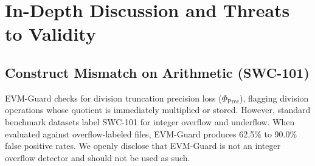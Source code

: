 \documentclass[conference]{IEEEtran}
\begin{document}
\begin{table}[h]
\centering
\small
\renewcommand{\arraystretch}{1.12}
\caption{Final pre-registered synthetic test (210 Solidity 0.5.12 contracts, template injection). Exact 95\% Clopper--Pearson intervals. Denial of service has no positives for the baselines to detect in this corpus.}
\label{tab:final_synth}
\end{table}

\section{In-Depth Discussion and Threats to Validity}\label{sec:discussion}

\subsection{Construct Mismatch on Arithmetic (SWC-101)}
EVM-Guard checks for division truncation precision loss ($\Phi_{\mathrm{Prec}}$), flagging division operations whose quotient is immediately multiplied or stored. However, standard benchmark datasets label SWC-101 for integer overflow and underflow. When evaluated against overflow-labeled files, EVM-Guard produces 62.5\% to 90.0\% false positive rates. We openly disclose that EVM-Guard is not an integer overflow detector and should not be used as such.
\end{document}
